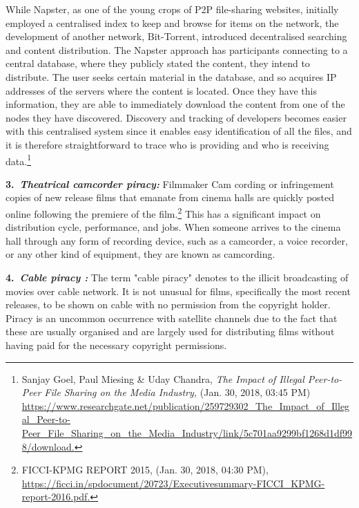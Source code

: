 \begin{multicols}{2}
\vspace{-.15cm}

\noi
While Napster, as one of the young crops of P2P file-sharing websites, initially employed a
centralised index to keep and browse for items on the network, the development of another
network, Bit-Torrent, introduced decentralised searching and content distribution. The
Napster approach has participants connecting to a central database, where they publicly stated
the content, they intend to distribute. The user seeks certain material in the database, and so
acquires IP addresses of the servers where the content is located. Once they have this
information, they are able to immediately download the content from one of the nodes they
have discovered. Discovery and tracking of developers becomes easier with this centralised
system since it enables easy identification of all the files, and it is therefore straightforward to
trace who is providing and who is receiving data.\footnote{Sanjay Goel, Paul Miesing \& Uday Chandra, \textit{The Impact of Illegal Peer-to-Peer File Sharing on the Media Industry,} (Jan. 30, 2018, 03:45 PM)  \url{https://www.researchgate.net/publication/259729302_The_Impact_of_Illegal_Peer-to-Peer_File_Sharing_on_the_Media_Industry/link/5c701aa9299bf1268d1df998/download.}}

\vspace{-.15cm}

\noi
{\large \bfseries 3.~\textit{Theatrical camcorder piracy:}}  Filmmaker Cam cording or infringement copies of new
release films that emanate from cinema halls are quickly posted online following the
premiere of the film.\footnote{FICCI-KPMG REPORT 2015, (Jan. 30, 2018, 04:30 PM),\\ \url{https://ficci.in/spdocument/20723/Executivesummary-FICCI_KPMG-report-2016.pdf.}} This has a significant impact on distribution cycle, performance, and jobs. When someone arrives to the cinema hall through any form of recording device, such as
a camcorder, a voice recorder, or any other kind of equipment, they are known as camcording.

\vspace{-.15cm}

\noi
{\large \bfseries 4.~\textit{Cable piracy :}} The term "cable piracy" denotes to the illicit broadcasting of movies over
cable network. It is not unusual for films, specifically the most recent releases, to be shown
on cable with no permission from the copyright holder. Piracy is an uncommon occurrence
with satellite channels due to the fact that these are usually organised and are largely used for
distributing films without having paid for the necessary copyright permissions.


\end{multicols}
